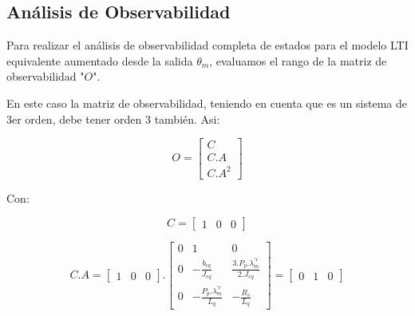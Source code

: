 \documentclass{article}
\begin{document}

\subsection{Análisis de Observabilidad}

Para realizar el análisis de observabilidad completa de estados para el modelo LTI equivalente 
aumentado desde la salida $\theta_m$, evaluamos el rango de la matriz de observabilidad "$O$".

En este caso la matriz de observabilidad, teniendo en cuenta que es un sistema de 3er orden, 
debe tener orden 3 también. Asi:

\begin{equation}
    O = \begin{bmatrix}
        C \\
        C.A \\
        C.A^2
    \end{bmatrix}
\end{equation}

Con:

\begin{equation}
    C = \begin{bmatrix}
        1 & 0 & 0
    \end{bmatrix}
\end{equation}

\begin{equation}
    C.A = 
    \begin{bmatrix}
        1 & 0 & 0
    \end{bmatrix}.
    \begin{bmatrix}
        0 & 1 & 0 \\
        0 & -\frac{b_{eq}}{J_{eq}} & \frac{3.P_p.\lambda_m^{\prime r}}{2.J_{eq}} \\
        0 & -\frac{P_p.\lambda_m^{\prime r}}{L_q} & -\frac{R_s}{L_q}
    \end{bmatrix}
    =
    \begin{bmatrix}
        0 & 1 & 0
    \end{bmatrix}
\end{equation}
\end{document}
